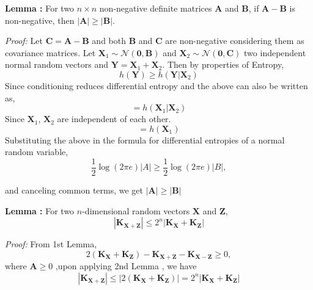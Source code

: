 \begin{tcolorbox}[boxrule=0pt,frame hidden,sharp corners,enhanced, opacityback=0, borderline west={2pt}{0pt}{blue}]
\textbf{Lemma :} For two $n \times n$ non-negative definite matrices $\mathbf{A}$ and $\mathbf{B}$, if $\mathbf{A} - \mathbf{B}$ is non-negative, then $|\mathbf{A}| \ge |\mathbf{B}|$.
\end{tcolorbox}
\textit{Proof:} Let $\mathbf{C} = \mathbf{A} - \mathbf{B}$  and both $\mathbf{B}$ and $\mathbf{C}$ are non-negative considering them as covariance matrices.
Let $\mathbf{X}_1 \sim \mathcal{N}(\mathbf{0}, \mathbf{B})$ and $\mathbf{X}_2 \sim \mathcal{N}(\mathbf{0}, \mathbf{C})$ two independent normal random vectors and $\mathbf{Y} = \mathbf{X}_1 + \mathbf{X}_2$. 
Then by properties of Entropy,
\begin{equation}
h(\mathbf{Y}) \ge h(\mathbf{Y}|\mathbf{X}_2) \label{eq:10.121}
\end{equation}
Since conditioning reduces differential entropy and the above can also be written as,
\begin{equation}
= h(\mathbf{X}_1|\mathbf{X}_2) \label{eq:10.122}
\end{equation}
Since  $\mathbf{X}_1 $, $ \mathbf{X}_2$ are independent of each other.
\begin{equation}
= h(\mathbf{X}_1) \label{eq:10.123}
\end{equation}
\newpage
Substituting the above in the formula for differential entropies of a normal random variable,
\begin{equation}
\frac{1}{2} \log(2\pi e){|A|} \geq \frac{1}{2} \log(2\pi e){|B|}, \label{eq:10.124}
\end{equation}

and canceling  common terms, we get $|\mathbf{A}| \ge |\mathbf{B}|$

\begin{tcolorbox}[boxrule=0pt,frame hidden,sharp corners,enhanced, opacityback=0, borderline west={2pt}{0pt}{blue}]
\textbf{Lemma :} For two $n$-dimensional random vectors $\mathbf{X}$ and $\mathbf{Z}$,
\begin{equation}
|\mathbf{K}_{\mathbf{X}+\mathbf{Z}}| \le 2^{n}|\mathbf{K}_\mathbf{X}+\mathbf{K}_\mathbf{Z}| 
\end{equation}
\end{tcolorbox}
\textit{Proof:} From 1st Lemma,
\begin{equation}
2(\mathbf{K}_\mathbf{X} + \mathbf{K}_\mathbf{Z}) - \mathbf{K}_{\mathbf{X}+\mathbf{Z}} - \mathbf{K}_{\mathbf{X}-\mathbf{Z}} \ge 0, \label{eq:10.126}
\end{equation}
where $\mathbf{A} \ge 0$ ,upon applying 2nd Lemma , we have
\begin{equation}
|\mathbf{K}_{\mathbf{X}+\mathbf{Z}}| \le |2(\mathbf{K}_\mathbf{X}+\mathbf{K}_\mathbf{Z})|= 2^{n}|\mathbf{K}_\mathbf{X}+\mathbf{K}_\mathbf{Z}|
\end{equation}

